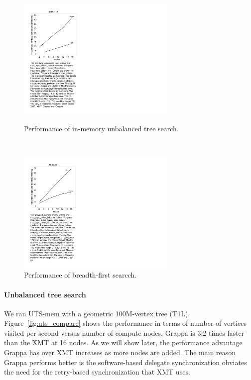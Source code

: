 \begin{figure}
\begin{center}

\hspace{-1in}\begin{minipage}{0.3\textwidth}
\begin{center}
\includegraphics[width=3in]{figs/uts_performance.pdf}
\caption{\label{fig:uts_compare} Performance of in-memory unbalanced tree search.}
\end{center}
\end{minipage}
\hspace{1.25in}\
\begin{minipage}{0.3\textwidth}
\begin{center}
\includegraphics[width=3in]{figs/bfs_performance}
\caption{\label{fig:bfs-performance} Performance of breadth-first searcch.}
\end{center}
\end{minipage}

\end{center}
\end{figure}

\paragraph{Unbalanced tree search} We ran UTS-mem with a geometric 100M-vertex tree (T1L). Figure~\ref{fig:uts_compare} shows the performance in terms of number of vertices visited per second versus number of compute nodes. Grappa is 3.2 times faster than the XMT at 16 nodes.  As we will show later, the performance advantage Grappa has over XMT increases as more nodes are added.  The main reason Grappa performs better is the software-based delegate synchronization obviates the need for the retry-based synchronization that XMT uses.


